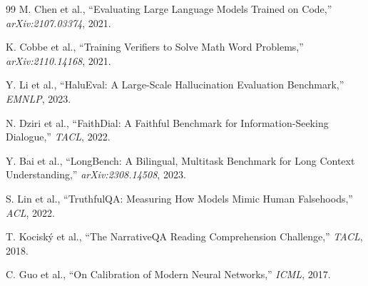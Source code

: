 \documentclass{article}
\begin{document}
\begin{thebibliography}{99}
M. Chen et al., ``Evaluating Large Language Models Trained on Code,'' \textit{arXiv:2107.03374}, 2021.

K. Cobbe et al., ``Training Verifiers to Solve Math Word Problems,'' \textit{arXiv:2110.14168}, 2021.

Y. Li et al., ``HaluEval: A Large-Scale Hallucination Evaluation Benchmark,'' \textit{EMNLP}, 2023.

N. Dziri et al., ``FaithDial: A Faithful Benchmark for Information-Seeking Dialogue,'' \textit{TACL}, 2022.

Y. Bai et al., ``LongBench: A Bilingual, Multitask Benchmark for Long Context Understanding,'' \textit{arXiv:2308.14508}, 2023.

S. Lin et al., ``TruthfulQA: Measuring How Models Mimic Human Falsehoods,'' \textit{ACL}, 2022.

T. Kocisk\'y et al., ``The NarrativeQA Reading Comprehension Challenge,'' \textit{TACL}, 2018.

C. Guo et al., ``On Calibration of Modern Neural Networks,'' \textit{ICML}, 2017.

\end{thebibliography}
\end{document}
